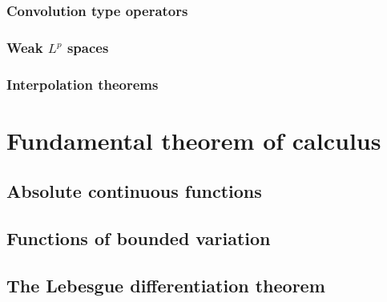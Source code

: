 \documentclass{../note}
\begin{document}
\section{Convolution type operators}
\section{Weak $L^p$ spaces}
\section{Interpolation theorems}

\part{Fundamental theorem of calculus}

\chapter{Absolute continuous functions}

\chapter{Functions of bounded variation}

\chapter{}

\chapter{The Lebesgue differentiation theorem}
\end{document}
